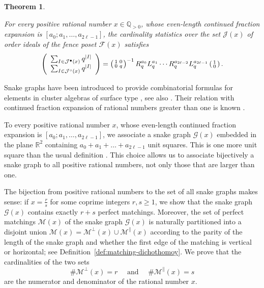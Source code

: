 \documentclass[a4paper,12pt]{amsart}
\newtheorem{maintheorem}{Theorem}
\newcommand{\Q}{\mathbb{Q}}
\newcommand{\R}{\mathbb{R}}
\newcommand{\xx}{{x}}
\newcommand{\Fcal}{{\mathcal{F}}}
\newcommand{\Gcal}{{\mathcal{G}}}
\newcommand{\Jcal}{{\mathcal{J}}}
\newcommand{\Mcal}{{\mathcal{M}}}
\newcommand{\0}{\mathtt{0}}
\newcommand{\1}{\mathtt{1}}
\newcommand{\2}{\mathtt{2}}
\newcommand{\3}{\mathtt{3}}
\newcommand{\carreplein}{{\perp}}
\newcommand{\carrevide}{{\parallel}}
\newcommand{\size}[1]{
    {|#1|}                 %
}
\begin{document}
\newcommand\MainTheoremC{
    For every positive rational number $x\in\Q_{>0}$,
whose even-length continued fraction expansion is $[a_0;a_1,\dots,a_{2\ell-1}]$,
the cardinality statistics over the set $\Jcal(\xx)$ of order ideals
of the fence poset $\Fcal(\xx)$ satisfies
\begin{equation*}
\left(\begin{array}{r}
        \sum_{I\in \Jcal^\bullet(\xx)} q^{\size{I}}\\
        \sum_{I\in \Jcal^\circ  (\xx)} q^{\size{I}}
\end{array}\right)
    =
    \left(\begin{smallmatrix} 1 & 0 \\ 0 & q \end{smallmatrix}\right)^{-1}
    R_q^{a_0}L_q^{a_1}\cdots R_q^{a_{2\ell-2}}L_q^{a_{2\ell-1}}
    \left(\begin{smallmatrix} 1 \\ 0 \end{smallmatrix}\right).
\end{equation*}
}

\begin{maintheorem}\label{thm:nice-formula-for-order-ideals}
\MainTheoremC
\end{maintheorem}

Snake graphs have been introduced to provide combinatorial formulas
for elements in cluster algebras of surface type
\cite{MR2661414,MR2807089,MR3034481,zbMATH06144657},
see also \cite{zbMATH07181526}.
Their relation with continued fraction expansion of rational numbers
greater than one is known \cite{zbMATH06559878,MR4058266}.

To every positive rational number $\xx$,
whose even-length continued fraction expansion is $[a_0;a_1,\dots,a_{2\ell-1}]$,
we associate a snake graph $\Gcal(\xx)$ embedded in the plane $\R^2$ containing
$a_0+a_1+\dots+a_{2\ell-1}$ unit squares.
This is one more unit square than the usual definition \cite{MR3778183}.
This choice allows us to associate bijectively a snake graph to all positive rational
numbers, not only those that are larger than one.

The bijection from positive rational numbers to the set of all snake graphs makes sense:
if $\xx=\frac{r}{s}$ for some coprime integers
$r,s\geq1$, we show that the snake graph $\Gcal(\xx)$ contains exactly $r+s$
perfect matchings.
Moreover, the set of perfect matchings $\Mcal(\xx)$
of the snake graph $\Gcal(\xx)$
is naturally partitioned into a disjoint union
$\Mcal(\xx)= \Mcal^\carreplein(\xx) \cup \Mcal^\carrevide(\xx)$ according to
the parity of the length of the snake graph and whether
the first edge of the matching is vertical or horizontal;
see Definition~\ref{def:matching-dichothomoy}. We prove that
the cardinalities of the two sets
\[
        \#\Mcal^\carreplein(\xx) = r
        \quad
        \text{ and }
        \quad
        \#\Mcal^\carrevide(\xx) = s
\]
are the numerator and denominator of the rational number $\xx$.
\end{document}
